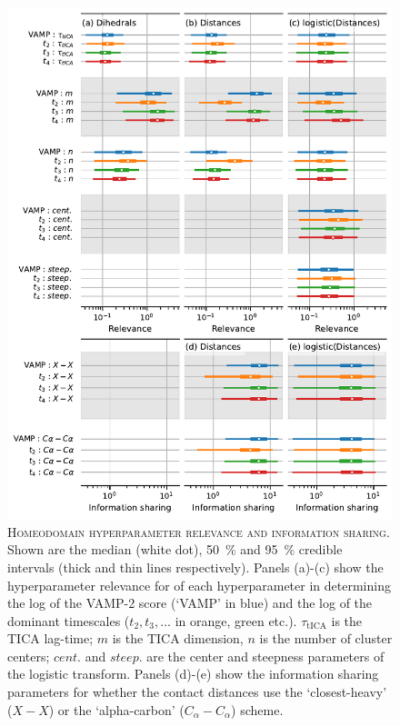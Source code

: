 \documentclass{article}
\begin{document}
\begin{figure}
    \centering
    \includegraphics[height=0.8\textheight]{figures/sensitivities/uvf_sensitivity.pdf}
    \caption{\textsc{Homeodomain hyperparameter relevance and information sharing}. Shown are the  median (white dot), \SI{50}{\percent} and \SI{95}{\percent} credible intervals (thick and thin lines respectively).  Panels (a)-(c) show the hyperparameter relevance for of each hyperparameter in determining the log of the VAMP-2 score (`VAMP' in blue) and the log of the dominant timescales ($t_{2}, t_{3}, ...$ in orange, green etc.). $\tau_{\mathrm{tICA}}$ is the TICA lag-time; $m$ is the TICA dimension, $n$ is the number of cluster centers; $cent.$ and $steep.$ are the center and steepness parameters of the logistic transform. Panels (d)-(e) show the information sharing parameters for whether the contact distances use the `closest-heavy' ($X-X$) or the `alpha-carbon' ($C_{\alpha}-C_{\alpha}$) scheme.  }
    \label{fig:uvf_sense}
\end{figure}
\end{document}
